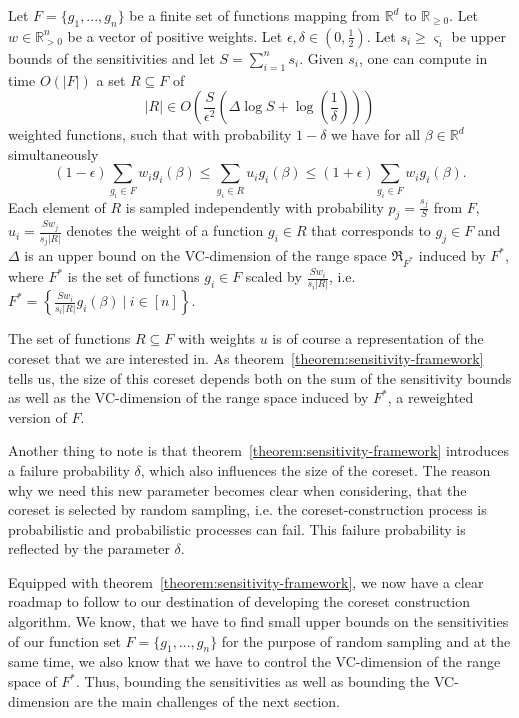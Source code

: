 \begin{theorem}
    \label{theorem:sensitivity-framework}
    Let $F = \{ g_1, ..., g_n \}$ be a finite set of functions
    mapping from $\mathbb{R}^d$ to $\mathbb{R}_{\geq 0}$.
    Let $w \in \mathbb{R}^n_{>0}$ be a vector of positive weights.
    Let $\epsilon, \delta \in (0, \frac{1}{2})$.
    Let $s_i \geq \varsigma_i$ be upper bounds of the sensitivities and
    let $S = \sum_{i=1}^n s_i$.
    Given $s_i$, one can compute in time $O(|F|)$ a set
    $R \subseteq F$ of
    \begin{equation*}
        |R| \in O \left( \frac{S}{\epsilon^2} \left( \Delta \log S + \log \left( \frac{1}{\delta} \right) \right) \right)
    \end{equation*}
    weighted functions, such that with probability $1 - \delta$ we have
    for all $\beta \in \mathbb{R}^d$ simultaneously
    \begin{equation*}
        (1-\epsilon) \sum_{g_i \in F} w_i g_i(\beta) \leq \sum_{g_i \in R} u_i g_i(\beta) \leq (1 + \epsilon) \sum_{g_i \in F} w_i g_i(\beta).
    \end{equation*}
    Each element of $R$ is sampled independently with probability
    $p_j = \frac{s_j}{S}$ from $F$, $u_i = \frac{S w_j}{s_j |R|}$
    denotes the weight of a function $g_i \in R$ that corresponds to
    $g_j \in F$ and $\Delta$ is an upper bound on the
    VC-dimension of the range space $\mathfrak{R}_{F^\ast}$ induced by
    $F^\ast$, where $F^\ast$ is the set of functions $g_i \in F$
    scaled by $\frac{S w_i}{s_i |R|}$, i.e.
    $F^\ast = \left\{ \frac{S w_i}{s_i |R|} g_i(\beta) \ |\ i \in [n] \right\}$.
\end{theorem}

The set of functions $R \subseteq F$ with weights $u$ is of course
a representation of
the coreset that we are interested in.
As theorem~\ref{theorem:sensitivity-framework} tells us, the
size of this coreset depends both on the sum of the sensitivity bounds
as well as the VC-dimension of the range space induced by $F^\ast$,
a reweighted version of $F$.

Another thing to note is that theorem~\ref{theorem:sensitivity-framework}
introduces a failure probability $\delta$, which also influences the
size of the coreset. The reason why we need this new parameter becomes
clear when considering, that the coreset is selected by random sampling,
i.e. the coreset-construction process is probabilistic and
probabilistic processes can fail. This failure probability is reflected
by the parameter $\delta$.

Equipped with theorem~\ref{theorem:sensitivity-framework}, we now have
a clear roadmap to follow to our destination of developing the
coreset construction
algorithm. We know, that we have to find small upper bounds on
the sensitivities of our function set $F = \{g_1, ..., g_n\}$
for the purpose of random sampling and at the
same time, we also know that we have to control the VC-dimension of the
range space of $F^\ast$.
Thus, bounding the sensitivities as well as bounding the VC-dimension
are the main challenges of the next section.


